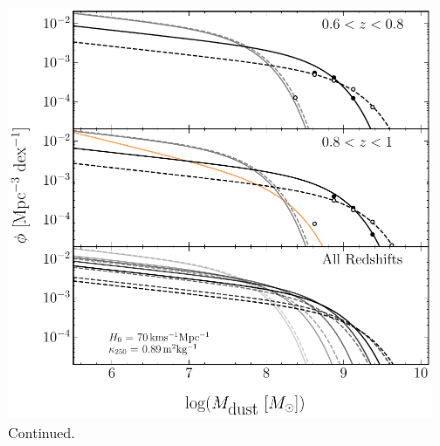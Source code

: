\begin{figure}
    \ContinuedFloat
    \centering
    \includegraphics[width=\columnwidth]{Figures/dmf_schechter_part2.pdf}
    \caption{Continued.}
\end{figure}

